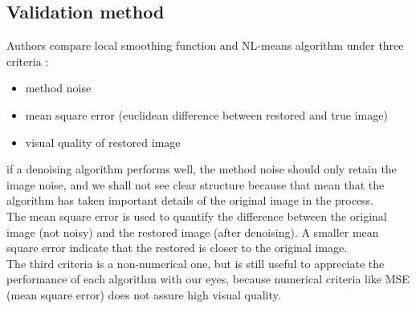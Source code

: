 \documentclass[a4paper, twocolumn, twoside]{article}
\begin{document}
\subsection{Validation method}
Authors compare local smoothing function and NL-means algorithm under three criteria :
\begin{itemize}
	\item method noise
	\item mean square error (euclidean difference between restored and true image)
	\item visual quality of restored image
\end{itemize}
if a denoising algorithm performs well, the method noise should only retain the image noise, and we shall not see clear structure because 
that mean that the algorithm has taken important details of the original image in the process.\\
The mean square error is used to quantify the difference between the original image (not noisy) and the restored image (after denoising).
A smaller mean square error indicate that the restored is closer to the original image.\\
The third criteria is a non-numerical one, but is still useful to appreciate the performance of each algorithm with our eyes,
because numerical criteria like MSE (mean square error) does not assure high visual quality.
\end{document}
